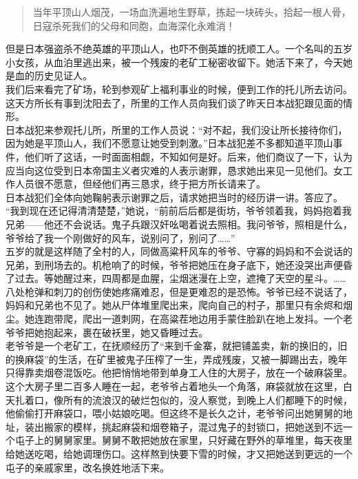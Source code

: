 \begin{quote}
	当年平顶山人烟茂，一场血洗遍地生野草，拣起一块砖头，拾起一根人骨，日寇杀死我们的父母和同胞，血海深化永难消！\\
\end{quote}

但是日本强盗杀不绝英雄的平顶山人，也吓不倒英雄的抚顺工人。一个名叫的五岁小女孩，从血泊里逃出来，被一个残废的老矿工秘密收留下。她活下来了，今天她是血的历史见证人。\\

我们后来看完了矿场，轮到参观矿上福利事业的时候，便到工作的托儿所去访问。这天方所长有事到沈阳去了，所里的工作人员向我们谈了昨天日本战犯跟见面的情形。\\

日本战犯来参观托儿所，所里的工作人员说：“对不起，我们没让所长接待你们，因为她是平顶山人，我们不愿意让她受到刺激。”日本战犯差不多都知道平顶山事件，他们听了这话，一时面面相觑，不知如何是好。后来，他们商议了一下，认为应当向这位受到日本帝国主义者灾难的人表示谢罪，恳求她出来见一见他们。女工作人员很不愿意，但经他们再三恳求，终于把方所长请来了。\\

日本战犯们全体向她鞠躬表示谢罪之后，请求她把当时的经历讲一讲。答应了。\\

“我到现在还记得清清楚楚，”她说，“前前后后都是街坊，爷爷领着我，妈妈抱着我兄弟——他还不会说话。鬼子兵跟汉奸吆喝着说去照相。我问爷爷，照相是什么，爷爷给了我一个刚做好的风车，说别问了，别问了……”\\

五岁的就是这样随了全村的人，同做高粱秆风车的爷爷、守寡的妈妈和不会说话的兄弟，到刑场去的。机枪响了的时候，爷爷把她压在身子底下，她还没哭出声便昏了过去。等她醒过来，四周都是血腥，尘烟迷漫在上空，遮掩了天空的星斗。……\\

八处枪弹和刺刀的创伤使她疼痛难忍，但是更难忍的是恐怖。爷爷已经不说话了，妈妈和兄弟也不见了。她从尸体堆里爬出来，爬向自己的村子，那里只有余烬和烟尘。她连跑带爬，爬出一道刺网，在高粱茬地边用手蒙住脸趴在地上发抖。一个老爷爷把她抱起来，裹在破袄里，她又昏睡过去。\\

老爷爷是一个老矿工，在抚顺经历了“来到千金寨，就把铺盖卖，新的换旧的，旧的换麻袋”的生活，在矿里被鬼子压榨了一生，弄成残废，又被一脚踢出去，晚年只得靠卖烟卷混饭吃。他把悄悄地带到单身工人住的大房子，放在一个破麻袋里。这个大房子里二百多人睡在一起，老爷爷占着地头一个角落，麻袋就放在这里，白天扎着口，像所有的流浪汉的破烂包似的，没人察觉，到晚上人们都睡下的时候，他偷偷打开麻袋口，喂小姑娘吃喝。但这终不是长久之计，老爷爷问出她舅舅的地址，装出搬家的模样，挑起麻袋和烟卷箱子，混过鬼子的封锁口，把她送到不远一个屯子上的舅舅家里。舅舅不敢把她放在家里，只好藏在野外的草堆里，每天夜里给她送吃喝，给她调理伤口。这样熬到快要下雪的时候，才又把她送到更远的一个屯子的亲戚家里，改名换姓地活下来。\\


